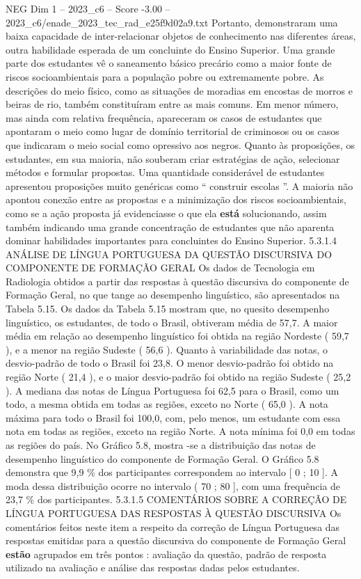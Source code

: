 \begin{textsample}{NEG Dim 1 – 2023\_c6 – Score -3.00 – 2023\_c6/enade\_2023\_tec\_rad\_e25f9d02a9.txt}
Portanto, demonstraram uma baixa capacidade de inter-relacionar objetos de conhecimento nas diferentes áreas, outra habilidade esperada de um concluinte do Ensino Superior.
Uma grande parte dos estudantes vê o saneamento básico precário como a maior fonte de riscos socioambientais para a população pobre ou extremamente pobre.
As descrições do meio físico, como as situações de moradias em encostas de morros e beiras de rio, também constituíram entre as mais comuns.
Em menor número, mas ainda com relativa frequência, apareceram os casos de estudantes que apontaram o meio como lugar de domínio territorial de criminosos ou os casos que indicaram o meio social como opressivo aos negros.
Quanto às proposições, os estudantes, em sua maioria, não souberam criar estratégias de ação, selecionar métodos e formular propostas.
Uma quantidade considerável de estudantes apresentou proposições muito genéricas como “ construir escolas ”.
A maioria não apontou conexão entre as propostas e a minimização dos riscos socioambientais, como se a ação proposta já evidenciasse o que ela \textbf{está} solucionando, assim também indicando uma grande concentração de estudantes que não aparenta dominar habilidades importantes para concluintes do Ensino Superior. 5.3.1.4 ANÁLISE DE LÍNGUA PORTUGUESA DA QUESTÃO DISCURSIVA DO COMPONENTE DE FORMAÇÃO GERAL Os dados de Tecnologia em Radiologia obtidos a partir das respostas à questão discursiva do componente de Formação Geral, no que tange ao desempenho linguístico, são apresentados na Tabela 5.15.
Os dados da Tabela 5.15 mostram que, no quesito desempenho linguístico, os estudantes, de todo o Brasil, obtiveram média de 57,7.
A maior média em relação ao desempenho linguístico foi obtida na região Nordeste ( 59,7 ), e a menor na região Sudeste ( 56,6 ).
Quanto à variabilidade das notas, o desvio-padrão de todo o Brasil foi 23,8.
O menor desvio-padrão foi obtido na região Norte ( 21,4 ), e o maior desvio-padrão foi obtido na região Sudeste ( 25,2 ).
A mediana das notas de Língua Portuguesa foi 62,5 para o Brasil, como um todo, a mesma obtida em todas as regiões, exceto no Norte ( 65,0 ).
A nota máxima para todo o Brasil foi 100,0, com, pelo menos, um estudante com essa nota em todas as regiões, exceto na região Norte.
A nota mínima foi 0,0 em todas as regiões do país.
No Gráfico 5.8, mostra -se a distribuição das notas de desempenho linguístico do componente de Formação Geral.
O Gráfico 5.8 demonstra que 9,9 \% dos participantes correspondem ao intervalo [ 0 ; 10 ].
A moda dessa distribuição ocorre no intervalo ( 70 ; 80 ], com uma frequência de 23,7 \% dos participantes. 5.3.1.5 COMENTÁRIOS SOBRE A CORREÇÃO DE LÍNGUA PORTUGUESA DAS RESPOSTAS À QUESTÃO DISCURSIVA Os comentários feitos neste item a respeito da correção de Língua Portuguesa das respostas emitidas para a questão discursiva do componente de Formação Geral \textbf{estão} agrupados em três pontos : avaliação da questão, padrão de resposta utilizado na avaliação e análise das respostas dadas pelos estudantes.

\end{textsample}
